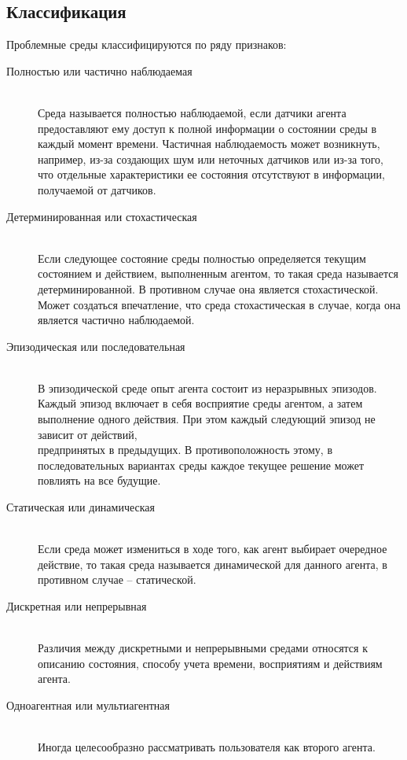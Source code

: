 \subsection{Классификация}

Проблемные среды классифицируются по ряду признаков:

\begin{description}
\item[Полностью или частично наблюдаемая] \hfill \\
  Среда называется полностью
  наблюдаемой, если датчики агента предоставляют ему доступ к полной
  информации о состоянии среды в каждый момент времени. Частичная
  наблюдаемость может возникнуть, например, из-за создающих шум или
  неточных датчиков или из-за того, что отдельные характеристики ее
  состояния отсутствуют в информации, получаемой от датчиков.
\item[Детерминированная или стохастическая] \hfill \\Если следующее состояние среды
  полностью определяется текущим состоянием и действием, выполненным
  агентом, то такая среда называется детерминированной. В противном
  случае она является стохастической. Может создаться впечатление, что
  среда стохастическая в случае, когда она является частично
  наблюдаемой.
\item[Эпизодическая или последовательная] \hfill \\В эпизодической среде опыт агента
  состоит из неразрывных эпизодов. Каждый эпизод включает в себя
  восприятие среды агентом, а затем выполнение одного действия. При этом
  каждый следующий эпизод не зависит от действий,\\предпринятых в
  предыдущих. В противоположность этому, в последовательных вариантах
  среды каждое текущее решение может повлиять на все будущие.
\item[Статическая или динамическая] \hfill \\Если среда может измениться в ходе того,
  как агент выбирает очередное действие, то такая среда называется
  динамической для данного агента, в противном случае -- статической.
\item[Дискретная или непрерывная] \hfill \\Различия между дискретными и непрерывными
  средами относятся к описанию состояния, способу учета времени,
  восприятиям и действиям агента.
\item[Одноагентная или мультиагентная] \hfill \\Иногда целесообразно рассматривать
  пользователя как второго агента.
\end{description}


